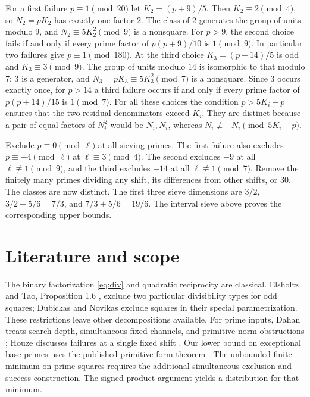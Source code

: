 \documentclass[a4paper,11pt]{article}
\theoremstyle{definition}\newtheorem{question}[theorem]{Question}
\begin{document}
For a first failure $p\equiv1\pmod{20}$ let $K_2=(p+9)/5$. Then
$K_2\equiv2\pmod4$, so $N_2=pK_2$ has exactly one factor $2$.
The class of $2$ generates the group of units modulo $9$, and
$N_2\equiv5K_2^2\pmod9$ is a nonsquare. For $p>9$, the second
choice fails if and only if every prime factor of $p(p+9)/10$ is
$1\pmod9$. In particular two failures give $p\equiv1\pmod{180}$.
At the third choice $K_3=(p+14)/5$ is odd and $K_3\equiv3\pmod9$.
The group of units modulo $14$ is isomorphic to that modulo $7$;
$3$ is a generator, and $N_3=pK_3\equiv5K_3^2\pmod7$ is a
nonsquare. Since $3$ occurs exactly once, for $p>14$ a third failure
occurs if and only if every prime factor of $p(p+14)/15$ is
$1\pmod7$. For all these choices the condition $p>5K_i-p$ ensures
that the two residual denominators exceed $K_i$. They are distinct because a pair
of equal factors of $N_i^2$ would be $N_i,N_i$, whereas
$N_i\not\equiv-N_i\pmod{5K_i-p}$.

Exclude $p\equiv0\pmod\ell$ at all sieving primes. The first
failure also excludes $p\equiv-4\pmod\ell$ at $\ell\equiv3\pmod4$.
The second excludes $-9$ at all $\ell\not\equiv1\pmod9$, and the
third excludes $-14$ at all $\ell\not\equiv1\pmod7$. Remove the
finitely many primes dividing any shift, its differences from other
shifts, or $30$. The classes are now distinct. The first three sieve
dimensions are $3/2$, $3/2+5/6=7/3$, and $7/3+5/6=19/6$.
The interval sieve above proves the corresponding upper bounds.



\section*{Literature and scope}
The binary factorization \eqref{eq:div} and quadratic reciprocity are classical. Elsholtz and Tao, Proposition 1.6 \cite{et}, exclude two particular divisibility types for odd squares; Dubickas and Novikas \cite{dn} exclude squares in their special parametrization. These restrictions leave other decompositions available. For prime inputs, Dahan treats search depth, simultaneous fixed channels, and primitive norm obstructions \cite{dahan}; Houze discusses failures at a single fixed shift \cite{houze}. Our lower bound on exceptional base primes uses the published primitive-form theorem \cite{fhrss}. The unbounded finite minimum on prime squares requires the additional simultaneous exclusion and success construction. The signed-product argument yields a distribution for that minimum.
\end{document}
